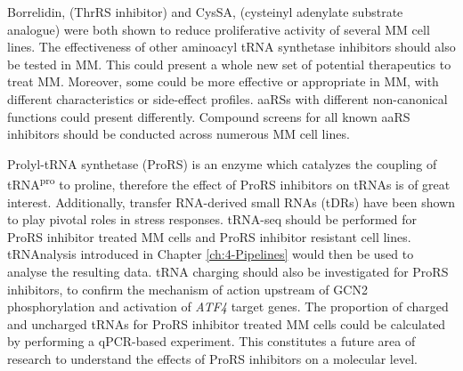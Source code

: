 Borrelidin, (ThrRS inhibitor)  and CysSA, (cysteinyl adenylate substrate analogue) were both shown to reduce proliferative activity of several MM cell lines\cite{bottpreclinical2022}.
The effectiveness of other aminoacyl tRNA synthetase inhibitors should also be tested in MM\@.
This could present a whole new set of potential therapeutics to treat MM\@.
Moreover, some could be more effective or appropriate in MM, with different characteristics or side-effect profiles.
aaRSs with different non-canonical functions could present differently.
Compound screens for all known aaRS inhibitors should be conducted across numerous MM cell lines.

Prolyl-tRNA synthetase (ProRS) is an enzyme which catalyzes the coupling of tRNA\textsuperscript{pro} to proline, therefore the effect of ProRS inhibitors on tRNAs is of great interest.
Additionally, transfer RNA-derived small RNAs (tDRs) have been shown to play pivotal roles in stress responses\cite{li2022distinct}.
tRNA-seq should be performed for ProRS inhibitor treated MM cells and ProRS inhibitor resistant cell lines.
tRNAnalysis introduced in Chapter \ref{ch:4-Pipelines} would then be used to analyse the resulting data.
tRNA charging should also be investigated for ProRS inhibitors, to confirm the mechanism of action upstream of GCN2 phosphorylation and activation of \textit{ATF4} target genes.
The proportion of charged and uncharged tRNAs for ProRS inhibitor treated MM cells could be calculated by performing a qPCR-based experiment.
This constitutes a future area of research to understand the effects of ProRS inhibitors on a molecular level.


%
%
%
%
